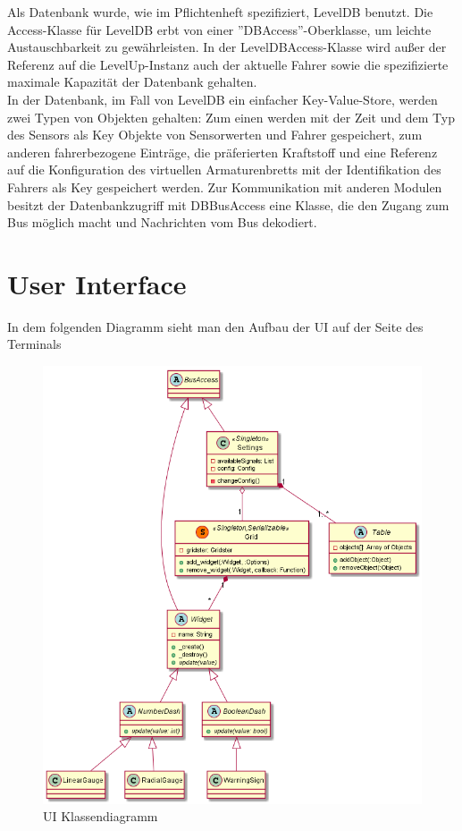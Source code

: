 \documentclass[entwurf.tex]{subfiles}
\begin{document}
  	Als Datenbank wurde, wie im Pflichtenheft spezifiziert, LevelDB benutzt. Die Access-Klasse für LevelDB erbt von einer ''DBAccess''-Oberklasse, um leichte Austauschbarkeit zu gewährleisten. In der LevelDBAccess-Klasse wird außer der Referenz auf die LevelUp-Instanz auch der aktuelle Fahrer sowie die spezifizierte maximale Kapazität der Datenbank gehalten. \\ In der Datenbank, im Fall von LevelDB ein einfacher Key-Value-Store, werden zwei Typen von Objekten gehalten: Zum einen werden mit der Zeit und dem Typ des Sensors als Key Objekte von Sensorwerten und Fahrer gespeichert, zum anderen fahrerbezogene Einträge, die präferierten Kraftstoff und eine Referenz auf die Konfiguration des virtuellen Armaturenbretts mit der Identifikation des Fahrers als Key gespeichert werden. Zur Kommunikation mit anderen Modulen besitzt der Datenbankzugriff mit DBBusAccess eine Klasse, die den Zugang zum Bus möglich macht und Nachrichten vom Bus dekodiert. 
  	
  	
  	\newpage
  	\section{User Interface}
		In dem folgenden Diagramm sieht man den Aufbau der UI auf der Seite des Terminals
		\begin{figure}[H]
  			\begin{center}
 				\includegraphics[width=\textwidth]{diagrams/UI.png}
  				\caption{UI Klassendiagramm}
  			\end{center}
  		\end{figure}
  		
\end{document}
